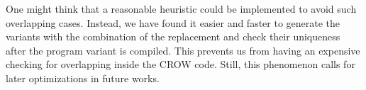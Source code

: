 One might think that a reasonable heuristic could be implemented to avoid such overlapping cases. Instead, we have found it easier and faster to generate the variants with the combination of the replacement and check their uniqueness after the program variant is compiled. This prevents us from having an expensive checking for overlapping inside the CROW code. Still, this phenomenon calls for later optimizations in future works.



